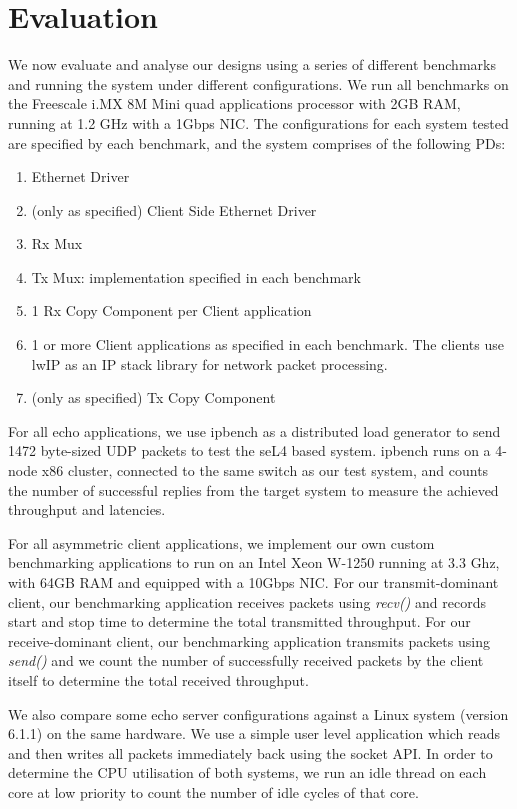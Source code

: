 \chapter{Evaluation}\label{ch:evaluation}

We now evaluate and analyse our designs using a series of different benchmarks and running
the system under different configurations. We run all benchmarks on the
Freescale i.MX 8M Mini quad applications processor with 2GB RAM, running at 1.2 GHz
with a 1Gbps NIC. The configurations for each system tested are specified by each benchmark,
and the system comprises of the following PDs:
\begin{enumerate}
    \item Ethernet Driver
    \item (only as specified) Client Side Ethernet Driver
    \item Rx Mux
    \item Tx Mux: implementation specified in each benchmark
    \item 1 Rx Copy Component per Client application
    \item 1 or more Client applications as specified in each benchmark. 
        The clients use lwIP \cite{Dunkels_01} as an IP stack library for network packet processing. 
    \item (only as specified) Tx Copy Component
\end{enumerate}

For all echo applications, we use ipbench as a distributed load generator 
to send 1472 byte-sized UDP packets to test the seL4 based system. ipbench runs on a 4-node x86 cluster, 
connected to the same switch as our test system,
and counts the number of successful replies from the target system to measure the achieved throughput and latencies.

For all asymmetric client applications, we implement our own custom benchmarking applications to run on an Intel Xeon W-1250
running at 3.3 Ghz, with 64GB RAM and equipped with a 10Gbps NIC. For our transmit-dominant client, our benchmarking
application receives packets using \emph{recv()} and records start and stop time to determine the total transmitted
throughput. For our receive-dominant client, our benchmarking application transmits packets using \emph{send()} and
we count the number of successfully received packets by the client itself to determine the total received throughput.

We also compare some echo server configurations against a Linux system (version 6.1.1) on the same hardware. 
We use a simple user level application which reads and then writes all packets immediately back using the socket API. 
In order to determine the CPU utilisation of both systems, we run an idle thread on each core
at low priority to count the number of idle cycles of that core. 

